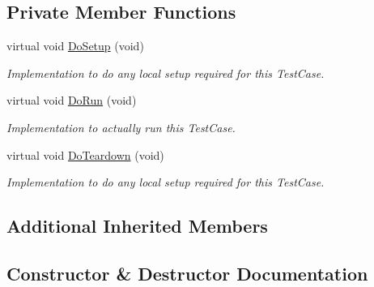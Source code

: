 \subsection*{Private Member Functions}
\begin{DoxyCompactItemize}
\item 
virtual void \hyperlink{classThreadedSimulatorEventsTestCase_a162a95193a9a9e7438fa7acd9c4a60fa}{Do\+Setup} (void)
\begin{DoxyCompactList}\small\item\em Implementation to do any local setup required for this Test\+Case. \end{DoxyCompactList}\item 
virtual void \hyperlink{classThreadedSimulatorEventsTestCase_a77bfe7eb0320066be432673a1f07a104}{Do\+Run} (void)
\begin{DoxyCompactList}\small\item\em Implementation to actually run this Test\+Case. \end{DoxyCompactList}\item 
virtual void \hyperlink{classThreadedSimulatorEventsTestCase_aee3809a0547567c2f10758f9487665d1}{Do\+Teardown} (void)
\begin{DoxyCompactList}\small\item\em Implementation to do any local setup required for this Test\+Case. \end{DoxyCompactList}\end{DoxyCompactItemize}
\subsection*{Additional Inherited Members}


\subsection{Constructor \& Destructor Documentation}
